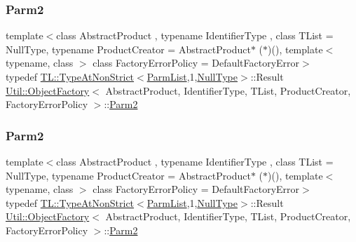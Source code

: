 \subsubsection{\texorpdfstring{Parm2}{Parm2}\hspace{0.1cm}{\footnotesize\ttfamily [1/2]}}
{\footnotesize\ttfamily template$<$class Abstract\+Product , typename Identifier\+Type , class T\+List  = Null\+Type, typename Product\+Creator  = Abstract\+Product$\ast$ ($\ast$)(), template$<$ typename, class $>$ class Factory\+Error\+Policy = Default\+Factory\+Error$>$ \\
typedef \mbox{\hyperlink{structUtil_1_1TL_1_1TypeAtNonStrict}{T\+L\+::\+Type\+At\+Non\+Strict}}$<$\mbox{\hyperlink{classUtil_1_1ObjectFactory_a46f003a5928e8a60140e0a74ac261c36}{Parm\+List}},1,\mbox{\hyperlink{classUtil_1_1NullType}{Null\+Type}}$>$\+::Result \mbox{\hyperlink{classUtil_1_1ObjectFactory}{Util\+::\+Object\+Factory}}$<$ Abstract\+Product, Identifier\+Type, T\+List, Product\+Creator, Factory\+Error\+Policy $>$\+::\mbox{\hyperlink{classUtil_1_1ObjectFactory_ae438d0c17d1510e6fd7db9ac479a371f}{Parm2}}}

\mbox{\label{classUtil_1_1ObjectFactory_ae438d0c17d1510e6fd7db9ac479a371f}} 
\subsubsection{\texorpdfstring{Parm2}{Parm2}\hspace{0.1cm}{\footnotesize\ttfamily [2/2]}}
{\footnotesize\ttfamily template$<$class Abstract\+Product , typename Identifier\+Type , class T\+List  = Null\+Type, typename Product\+Creator  = Abstract\+Product$\ast$ ($\ast$)(), template$<$ typename, class $>$ class Factory\+Error\+Policy = Default\+Factory\+Error$>$ \\
typedef \mbox{\hyperlink{structUtil_1_1TL_1_1TypeAtNonStrict}{T\+L\+::\+Type\+At\+Non\+Strict}}$<$\mbox{\hyperlink{classUtil_1_1ObjectFactory_a46f003a5928e8a60140e0a74ac261c36}{Parm\+List}},1,\mbox{\hyperlink{classUtil_1_1NullType}{Null\+Type}}$>$\+::Result \mbox{\hyperlink{classUtil_1_1ObjectFactory}{Util\+::\+Object\+Factory}}$<$ Abstract\+Product, Identifier\+Type, T\+List, Product\+Creator, Factory\+Error\+Policy $>$\+::\mbox{\hyperlink{classUtil_1_1ObjectFactory_ae438d0c17d1510e6fd7db9ac479a371f}{Parm2}}}

